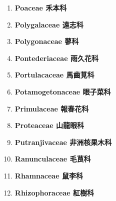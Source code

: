 \begin{enumerate}
        
      \item[] \begin{small}\textbf{Poaceae 禾本科} \end{small}
        
      \item[] \begin{small}\textbf{Polygalaceae 遠志科} \end{small}
        
      \item[] \begin{small}\textbf{Polygonaceae 蓼科} \end{small}
        
      \item[] \begin{small}\textbf{Pontederiaceae 雨久花科} \end{small}
        
      \item[] \begin{small}\textbf{Portulacaceae 馬齒莧科} \end{small}
        
      \item[] \begin{small}\textbf{Potamogetonaceae 眼子菜科} \end{small}
        
      \item[] \begin{small}\textbf{Primulaceae 報春花科} \end{small}
        
      \item[] \begin{small}\textbf{Proteaceae 山龍眼科} \end{small}
        
      \item[] \begin{small}\textbf{Putranjivaceae 非洲核果木科} \end{small}
        
      \item[] \begin{small}\textbf{Ranunculaceae 毛茛科} \end{small}
        
      \item[] \begin{small}\textbf{Rhamnaceae 鼠李科} \end{small}
        
      \item[] \begin{small}\textbf{Rhizophoraceae 紅樹科} \end{small}

\end{enumerate}
